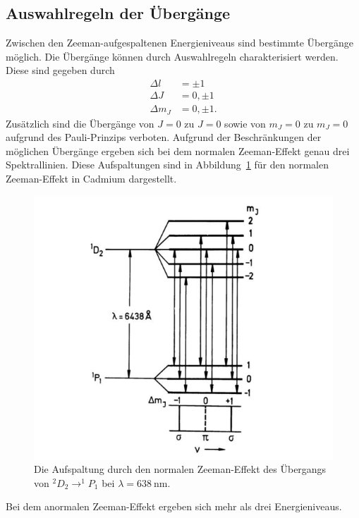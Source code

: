 \subsection{Auswahlregeln der Übergänge}
\label{subsec:auswahlregeln}
Zwischen den Zeeman-aufgespaltenen Energieniveaus sind bestimmte Übergänge
möglich. Die Übergänge können durch Auswahlregeln charakterisiert werden.
Diese sind gegeben durch
\begin{align}
  \Delta l &= \pm 1 \\
  \Delta J & =  0, \pm 1 \\
  \Delta m_{J} & = 0, \pm 1.
  \label{eqn:auswahlregeln}
\end{align}
Zusätzlich sind die Übergänge von $J = 0$ zu $J = 0$ sowie von $m_{J} = 0$ zu
$m_{J} = 0$ aufgrund des Pauli-Prinzips verboten. Aufgrund der Beschränkungen
der möglichen Übergänge ergeben sich bei dem normalen Zeeman-Effekt genau drei
Spektrallinien.
Diese Aufspaltungen sind in Abbildung~\ref{fig:uebergang1} für den normalen
Zeeman-Effekt in Cadmium dargestellt.
\begin{figure}[H]
  \centering
  \includegraphics[scale=0.4]{pictures/zeemancadmium1.png}
  \caption{Die Aufspaltung durch den normalen Zeeman-Effekt des Übergangs von $^{2}D_{2} \rightarrow ^{1}P_{1}$ bei $\lambda = \SI{638}{\nano\meter}$. \cite{HakenWolf}}
  \label{fig:uebergang1}
\end{figure}
\noindent
Bei dem anormalen Zeeman-Effekt ergeben sich mehr als drei Energieniveaus.
